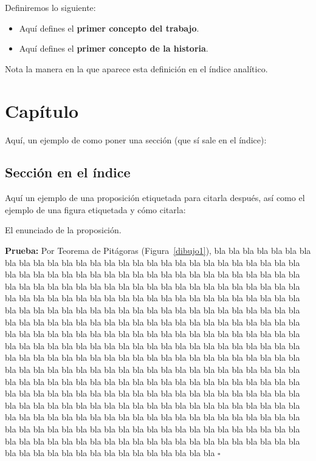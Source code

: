 \documentclass[12pt]{book}%
\theoremstyle{newstyle}%
\newcommand\fin[1]{\leavevmode\unskip\penalty9999 \hbox{}\nobreak\hfill\quad\hbox{#1}}
\newcommand\FINPBA{\fin{$\square$}}
\newenvironment{pba}{\noindent \textbf{Prueba:}}{\FINPBA}
\begin{document}
\begin{df} Definiremos lo siguiente:
\begin{itemize}
\item Aquí defines el \textbf{primer concepto del trabajo}.
\item Aquí defines el \textbf{primer concepto de la historia}.
\end{itemize}
\end{df}

Nota la manera en la que aparece esta definición en el índice analítico.


\chapter{Capítulo}

Aquí, un ejemplo de como poner una sección (que sí sale en el índice):


\section{Sección en el índice}

Aquí un ejemplo de una proposición etiquetada para citarla después, así como el ejemplo de una figura etiquetada y cómo citarla:
 
\begin{prop}[Prueba]\label{prop}
El enunciado de la proposición.
\end{prop}
\begin{pba}
Por Teorema de Pitágoras (Figura~\ref{dibujo1}), bla bla bla bla bla bla bla bla bla bla bla bla bla bla bla bla bla bla bla bla bla bla bla bla bla bla bla bla bla bla bla bla bla bla bla bla bla bla bla bla bla bla bla bla bla bla bla bla bla bla bla bla bla bla bla bla bla bla bla bla bla bla bla bla bla bla bla bla bla bla bla bla bla bla bla bla bla bla bla bla bla bla bla bla bla bla bla bla bla bla bla bla bla bla bla bla bla bla bla bla bla bla bla bla bla bla bla bla bla bla bla bla bla bla bla bla bla bla bla bla bla bla bla bla bla bla bla bla bla bla bla bla bla bla bla bla bla bla bla bla bla bla bla bla bla bla bla bla bla bla bla bla bla bla bla bla bla bla bla bla bla bla bla bla bla bla bla bla bla bla bla bla bla bla bla bla bla bla bla bla bla bla bla bla bla bla bla bla bla bla bla bla bla bla bla bla bla bla bla bla bla bla bla bla bla bla bla bla bla bla bla bla bla bla bla bla bla bla bla bla bla bla bla bla bla bla bla bla bla bla bla bla bla bla bla bla bla bla bla bla bla bla bla bla bla bla bla bla bla bla bla bla bla bla bla bla bla bla bla bla bla bla bla bla bla bla bla bla bla bla bla bla bla bla bla bla bla bla bla bla bla bla bla bla bla bla bla bla bla bla bla bla bla bla bla bla bla bla bla bla bla bla bla bla bla bla bla bla bla bla bla bla bla bla bla bla bla bla bla bla bla bla bla bla bla bla bla bla bla bla bla bla bla bla bla bla bla bla bla bla bla bla bla bla bla bla bla bla bla bla bla bla bla bla bla bla bla bla 
\end{pba}
\end{document}
